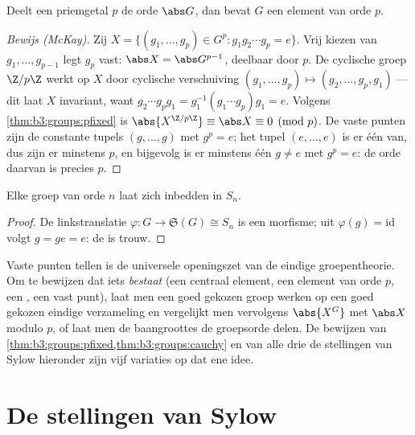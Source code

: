 \begin{theorem}[Cauchy]\label{thm:b3:groups:cauchy}
Deelt een priemgetal $p$ de orde $\abs G$, dan bevat $G$ een
element van orde $p$.
\end{theorem}

\begin{proof}[Bewijs (McKay)]
Zij $X = \{(g_1, \dots, g_p) \in G^p : g_1 g_2 \cdots g_p = e\}$.
Vrij kiezen van $g_1, \dots, g_{p-1}$ legt $g_p$ vast: $\abs X =
\abs G^{p-1}$, deelbaar door $p$. De cyclische groep $\Z/p\Z$ werkt
op $X$ door cyclische verschuiving $(g_1, \dots, g_p) \mapsto (g_2,
\dots, g_p, g_1)$ --- dit laat $X$ invariant, want $g_2 \cdots g_p
g_1 = g_1^{-1}(g_1 \cdots g_p)g_1 = e$. Volgens
\cref{thm:b3:groups:pfixed} is $\abs{X^{\Z/p\Z}} \equiv \abs X
\equiv 0 \pmod p$. De vaste punten zijn de constante tupels $(g,
\dots, g)$ met $g^p = e$; het tupel $(e, \dots, e)$ is er één van,
dus zijn er minstens $p$, en bijgevolg is er minstens één $g \neq
e$ met $g^p = e$: de orde daarvan is precies $p$.
\end{proof}

\begin{theorem}[Cayley]\label{thm:b3:groups:cayley}
Elke groep van orde $n$ laat zich inbedden in $S_n$.
\end{theorem}

\begin{proof}
De linkstranslatie $\varphi \colon G \to \mathfrak S(G) \cong S_n$
is een morfisme; uit $\varphi(g) = \mathrm{id}$ volgt $g = ge = e$:
de  is trouw.
\end{proof}

\begin{method}\label{met:b3:groups:counting}
Vaste punten tellen is de universele openingszet van de eindige
groepentheorie. Om te bewijzen dat iets \emph{bestaat} (een
centraal element, een element van orde $p$, een , een
vast punt), laat men een goed gekozen groep werken op een goed
gekozen eindige verzameling en vergelijkt men vervolgens
$\abs{X^G}$ met $\abs X$ modulo $p$, of laat men de baangroottes de
groepsorde delen. De bewijzen van
\cref{thm:b3:groups:pfixed,thm:b3:groups:cauchy} en van alle drie
de stellingen van Sylow hieronder zijn vijf variaties op dat ene
idee.
\end{method}

\section{De stellingen van Sylow}

